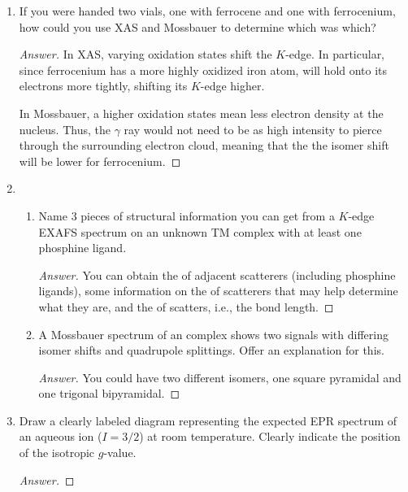 \documentclass[../psets.tex]{subfiles}
\begin{document}
\begin{enumerate}
\begin{enumerate}
\begin{proof}[Answer]
\begin{equation*}
            \end{equation*}
        \end{proof}
    \end{enumerate}
    \item If you were handed two vials, one with ferrocene and one with ferrocenium, how could you use XAS and Mossbauer to determine which was which?
    \begin{proof}[Answer]
        In XAS, varying oxidation states shift the $K$-edge. In particular, since ferrocenium has a more highly oxidized iron atom,  will hold onto its electrons more tightly, shifting its $K$-edge higher.\par
        In Mossbauer, a higher oxidation states mean less electron density at the nucleus. Thus, the $\gamma$ ray would not need to be as high intensity to pierce through the surrounding electron cloud, meaning that the the isomer shift will be lower for ferrocenium.
    \end{proof}
    \item 
    \begin{enumerate}
        \item Name 3 pieces of structural information you can get from a $K$-edge EXAFS spectrum on an unknown TM complex with at least one phosphine ligand.
        \begin{proof}[Answer]

            You can obtain the  of adjacent scatterers (including phosphine ligands), some information on the  of scatterers that may help determine what they are, and the  of scatters, i.e., the bond length.
        \end{proof}
        \item A Mossbauer spectrum of an  complex shows two signals with differing isomer shifts and quadrupole splittings. Offer an explanation for this.
        \begin{proof}[Answer]

            You could have two different isomers, one square pyramidal and one trigonal bipyramidal.
        \end{proof}
    \end{enumerate}
    \item Draw a clearly labeled diagram representing the expected EPR spectrum of an aqueous  ion ($I=3/2$) at room temperature. Clearly indicate the position of the isotropic $g$-value.
    \begin{proof}[Answer]


\end{proof}
\end{enumerate}
\end{document}
